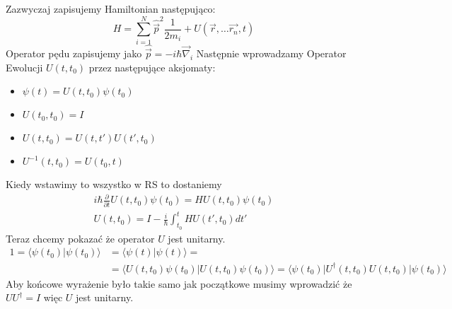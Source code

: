 Zazwyczaj zapisujemy Hamiltonian następująco:
$$  H=\sum_{i=1}^{N} \hat{\overrightarrow{p}}^{2} \frac{1}{2 m_{i}} + U\left(\vec{r}, \ldots \vec{r_{n}}, t\right)  $$
Operator pędu zapisujemy jako $\hat{\vec{p}} = -i \hbar \vec{\nabla}_i$
Następnie wprowadzamy Operator Ewolucji $U(t, t_0)$ przez następujące
aksjomaty: %
\begin{itemize}
	\item $\psi(t)=U\left(t, t_{0}\right) \psi\left(t_{0}\right)$
	\item $U(t_0, t_0) = I$
	\item $U(t, t_0) = U(t, t')U(t', t_0)$
	\item $U^{-1}(t, t_0) = U(t_0, t)$
\end{itemize}
Kiedy wstawimy to wszystko w RS to dostaniemy 
\begin{equation*}
	\begin{split}
		i \hbar \frac{\partial}{\partial t} U(t, t_0) \psi(t_0) = H U(t, t_0) \psi(t_0) \\
		U(t, t_0) = I - \frac{i}{\hbar} \int_{t_0}^t HU(t', t_0)dt'	
	\end{split}
\end{equation*}
Teraz chcemy pokazać że operator $U$ jest unitarny.
\begin{equation*}
	\begin{split}
		1=\langle\psi(t_{0}) | \psi(t_0)\rangle &= \langle\psi(t) | \psi(t)\rangle = \\
		&=\langle U(t, t_0) \psi(t_0) | U(t, t_0) \psi(t_0) \rangle = \langle \psi(t_0) | U^{\dagger}(t, t_0) U(t, t_0)| \psi(t_0)  \rangle
	\end{split}
\end{equation*}
Aby końcowe wyrażenie było takie samo jak początkowe musimy wprowadzić że $U U^{\dagger} = I$ więc $U$ jest unitarny.

